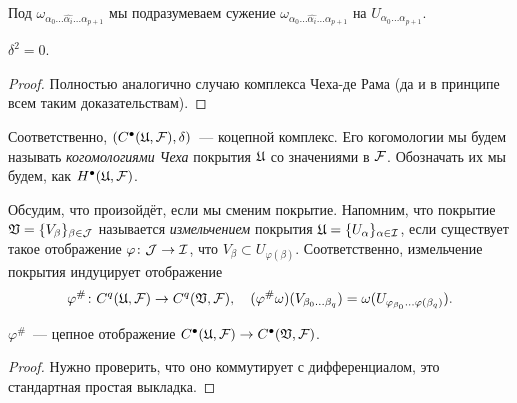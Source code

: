	\begin{remark}
		Под $\omega_{\alpha_0 \ldots \widehat{\alpha_i} \ldots \alpha_{p + 1}}$ мы подразумеваем сужение $\omega_{\alpha_0 \ldots \widehat{\alpha_i} \ldots \alpha_{p + 1}}$ на $U_{\alpha_0 \ldots \alpha_{p + 1}}$.
	\end{remark}

	\begin{lemma} 
		$\delta^2 = 0$.
	\end{lemma}
	\begin{proof}
		Полностью аналогично случаю комплекса Чеха-де Рама (да и в принципе всем таким доказательствам). 
	\end{proof}

	\begin{definition} 
		Соответственно, $(C^{\bullet}(\mathfrak{U}, \mathcal{F}), \delta)$~--- коцепной комплекс. Его когомологии мы будем называть \emph{когомологиями Чеха} покрытия $\mathfrak{U}$ со значениями в $\mathcal{F}$. Обозначать их мы будем, как $H^{\bullet}(\mathfrak{U}, \mathcal{F})$.   
	\end{definition}

	Обсудим, что произойдёт, если мы сменим покрытие. Напомним, что покрытие $\mathfrak{V} = \{ V_{\beta} \}_{\beta \in \mathcal{J}}$ называется \emph{измельчением} покрытия $\mathfrak{U} = \{ U_{\alpha} \}_{\alpha \in \mathcal{I}}$, если существует такое отображение $\varphi\colon \mathcal{J} \to \mathcal{I}$, что $V_{\beta} \subset U_{\varphi(\beta)}$. Соответственно, измельчение покрытия индуцирует отображение 
	\[
		\varphi^{\#} \colon C^{q}(\mathfrak{U}, \mathcal{F}) \to C^{q}(\mathfrak{V}, \mathcal{F}), \quad (\varphi^{\#} \omega)(V_{\beta_0 \ldots \beta_{q}}) = \omega(U_{\varphi_{\beta_0} \ldots \varphi(\beta_q)}). 
	\]

	\begin{lemma} 
		$\varphi^{\#}$~--- цепное отображение $C^{\bullet}(\mathfrak{U}, \mathcal{F}) \to C^{\bullet}(\mathfrak{V}, \mathcal{F})$. 
	\end{lemma}

	\begin{proof}
		Нужно проверить, что оно коммутирует с дифференциалом, это стандартная простая выкладка. 
	\end{proof}

